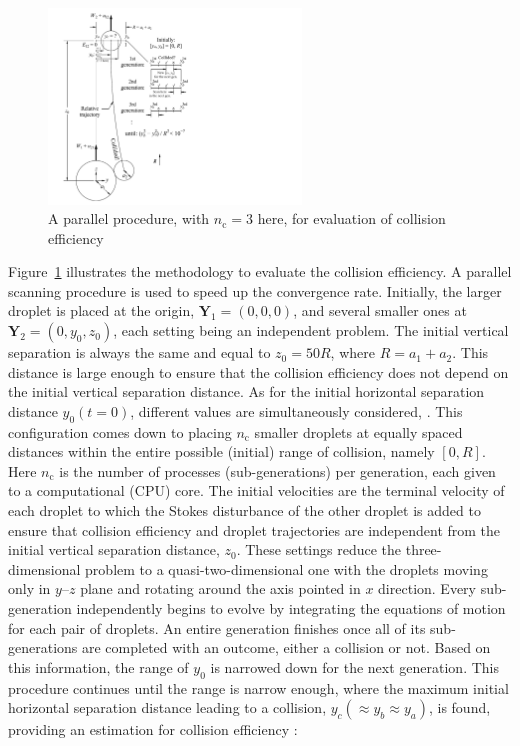 \documentclass[../thesis.tex]{subfiles}
\begin{document}
\begin{figure}%
\center
\includegraphics[trim=15mm 05mm 125mm 05mm, clip, width=0.6\textwidth]{../figs/PRF/fig1.pdf}
\caption{A parallel procedure, with $n_\text{c}=3$ here, for evaluation of collision efficiency}
\label{fig:colleff}
\end{figure}

Figure~\ref{fig:colleff} illustrates the methodology to evaluate the collision efficiency. A parallel scanning procedure is used to speed up the convergence rate. Initially, the larger droplet is placed at the origin, \mbox{$\boldsymbol{Y}_1=(0,0,0)$}, and several smaller ones at \mbox{$\boldsymbol{Y}_2=(0,y_0,z_0)$}, each setting being an independent problem. The initial vertical separation is always the same and equal to $z_0 = 50R$, where $R=a_1+a_2$. This distance is large enough to ensure that the collision efficiency does not depend on the initial vertical separation distance. As for the initial horizontal separation distance $y_0(t=0)$, different values are simultaneously considered, . This configuration comes down to placing $n_\text{c}$ smaller droplets at equally spaced distances within the entire possible (initial) range of collision, namely $[0,R]$. Here $n_\text{c}$ is the number of processes (sub-generations) per generation, each given to a computational (CPU) core. The initial velocities are the terminal velocity of each droplet to which the Stokes disturbance of the other droplet is added to ensure that collision efficiency and droplet trajectories are independent from the initial vertical separation distance, $z_0$. These settings reduce the three-dimensional problem to a quasi-two-dimensional one with the droplets moving only in $y$--$z$ plane and rotating around the axis pointed in $x$ direction. Every sub-generation independently begins to evolve by integrating the equations of motion for each pair of droplets. An entire generation finishes once all of its sub-generations are completed with an outcome, either a collision or not. Based on this information, the range of $y_0$ is narrowed down for the next generation. This procedure continues until the range is narrow enough, where the maximum initial horizontal separation distance leading to a collision, $y_c (\approx y_b \approx y_a)$, is found, providing an estimation for collision efficiency \citep{PK97}:
\end{document}
